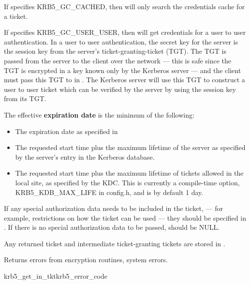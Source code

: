 If  specifies KRB5_GC_CACHED,
then  will only search the credentials cache
for a ticket.  

If  specifies KRB5_GC_USER_USER, then
 will get credentials for a user to user
authentication.  In a user to user authentication, the secret key for
the server 
is the session key from the server's ticket-granting-ticket
(TGT).  The TGT is passed from the server to the client over the
network --- this is safe since the TGT is encrypted in a key
known only by the Kerberos server --- and the client must pass
this TGT to  in
.  The Kerberos server will use
this TGT to construct a user to user ticket which can be verified by
the server by using the session key from its TGT.

The effective {\bf expiration date} is the minimum of the following:
\begin{itemize}
\item The expiration date as specified in
\item The requested start time plus the maximum lifetime of the
server as specified by the server's entry in the
Kerberos database.
\item The requested start time plus the maximum lifetime of tickets
allowed in the local site, as specified by the KDC.
This is currently a compile-time option,
KRB5_KDB_MAX_LIFE in config.h, and is by default 1 day.
\end{itemize}

If any special authorization data needs to be included in the ticket,
--- for example, restrictions on how the ticket can be used --- 
they should be specified in .   If there
is no special authorization data to be passed,
 should be NULL.

Any returned ticket and intermediate ticket-granting tickets are
stored in .

Returns errors from encryption routines, system errors.

\begin{funcdecl}{krb5_get_in_tkt}{krb5_error_code}{\funcinout}
\funcin
{}
\funcendfuncarg
{}
\funcendfuncarg
{}
\funcinout
{}
\end{funcdecl}

